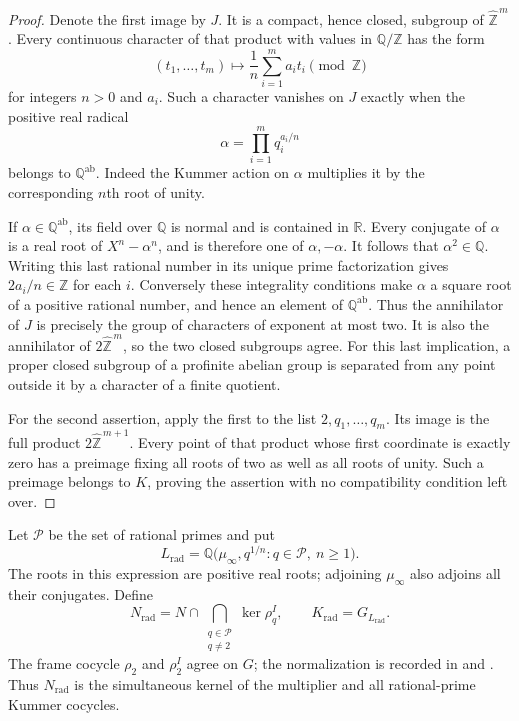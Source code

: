 \begin{proof}
Denote the first image by $J$. It is a compact, hence closed, subgroup
of $\widehat{\mathbb Z}^{\,m}$. Every continuous character of that
product with values in $\mathbb Q/\mathbb Z$ has the form
\[
 (t_1,\ldots,t_m)\longmapsto\frac1n\sum_{i=1}^m a_it_i\pmod{\mathbb Z}
\]
for integers $n>0$ and $a_i$. Such a character vanishes on $J$ exactly
when the positive real radical
\[
 \alpha=\prod_{i=1}^m q_i^{a_i/n}
\]
belongs to $\mathbb Q^{\mathrm{ab}}$. Indeed the Kummer action on
$\alpha$ multiplies it by the corresponding $n$th root of unity.

If $\alpha\in\mathbb Q^{\mathrm{ab}}$, its field over $\mathbb Q$
is normal and is contained in $\mathbb R$. Every conjugate of
$\alpha$ is a real root of $X^n-\alpha^n$, and is therefore one
of $\alpha,-\alpha$. It follows that $\alpha^2\in\mathbb Q$.
Writing this last rational number in its unique prime factorization
gives $2a_i/n\in\mathbb Z$ for each $i$. Conversely these
integrality conditions make $\alpha$ a square root of a positive
rational number, and hence an element of $\mathbb Q^{\mathrm{ab}}$.
Thus the annihilator of $J$ is precisely the group of characters
of exponent at most two. It is also the annihilator of
$2\widehat{\mathbb Z}^{\,m}$, so the two closed subgroups agree.
For this last implication, a proper closed subgroup of a profinite
abelian group is separated from any point outside it by a character
of a finite quotient.

For the second assertion, apply the first to the list
$2,q_1,\ldots,q_m$. Its image is the full product
$2\widehat{\mathbb Z}^{\,m+1}$. Every point of that product whose
first coordinate is exactly zero has a preimage fixing all roots
of two as well as all roots of unity. Such a preimage belongs to
$K$, proving the assertion with no compatibility condition left over.
\end{proof}

Let $\mathcal P$ be the set of rational primes and put
\[
 L_{\mathrm{rad}}=
 \mathbb Q\bigl(\mu_\infty,q^{1/n}:q\in\mathcal P,
                                      \ n\geq1\bigr).
\]
The roots in this expression are positive real roots; adjoining
$\mu_\infty$ also adjoins all their conjugates.
Define
\[
 N_{\mathrm{rad}}=N\cap
       \bigcap_{\substack{q\in\mathcal P\\q\ne2}}\ker\rho_q^I,
 \qquad K_{\mathrm{rad}}=G_{L_{\mathrm{rad}}}.
\]
The frame cocycle $\rho_2$ and $\rho_2^I$ agree on $G$;
the normalization is recorded in \cite[\S2.2, p.~100, footnote]{Furusho2003}
and \cite[Proposition~11]{H17}. Thus $N_{\mathrm{rad}}$ is the
simultaneous kernel of the multiplier and all rational-prime Kummer
cocycles.

